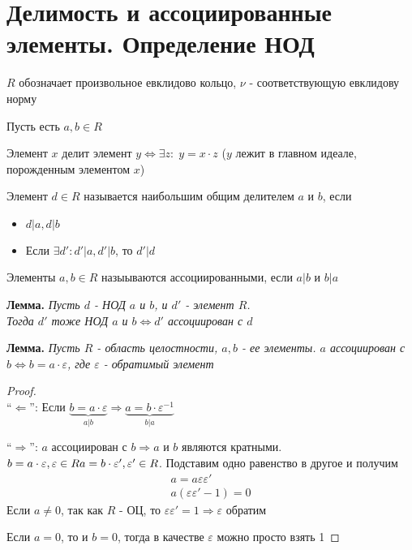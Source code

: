 \section{Делимость и ассоциированные элементы. Определение НОД}
\begin{normalsize}
    $R$ обозначает произвольное евклидово кольцо, $\nu$ - соответствующую евклидову норму
    \begin{theorem-non}
        Пусть есть $a, b \in R$
        \begin{conj}
            Элемент $x$ делит элемент $y \Longleftrightarrow \exists z: \; y = x \cdot z$ ($y$ лежит в главном идеале, порожденным элементом $x$)
        \end{conj}
        \begin{conj}
            Элемент $d \in R$ называется наибольшим общим делителем $a$ и $b$, если \begin{itemize}
                \item $d | a, d | b$
                \item Если $\exists d' : d' | a, d' | b$, то $d' | d$
            \end{itemize}
        \end{conj}
    \end{theorem-non}
        \begin{conj}
            Элементы $a, b \in R$ назыываются ассоциированными, если $a|b$ и $b|a$
        \end{conj}
        \textbf{Лемма.}
        \textit{Пусть $d$ - НОД $a$ и $b$, и $d'$ - элемент $R$. \\
        Тогда $d'$ тоже НОД $a$ и $b \Longleftrightarrow d'$ ассоциирован с $d$}

        \textbf{Лемма.} 
        \textit{
            Пусть $R$ - область целостности, $a, b$ - ее элементы. $a$ ассоциирован с $b \Longleftrightarrow b = a \cdot \varepsilon$, 
            где $\varepsilon$ - обратимый элемент 
        } 
        \begin{proof} \quad \\
            ``$\Longleftarrow$'': Если $\underbrace{b = a \cdot \varepsilon}_{a | b} \Longrightarrow \underbrace{a = b \cdot \varepsilon^{-1}}_{b | a}$ 

            ``$\Longrightarrow$'': $a$ ассоциирован с $b \Longrightarrow a$ и $b$ являются кратными. $b = a \cdot \varepsilon, \varepsilon \in R \\
            a = b \cdot \varepsilon', \varepsilon' \in R$. Подставим одно равенство в другое и получим 
            \begin{gather*}
                a = a\varepsilon\varepsilon' \\
                a(\varepsilon\varepsilon' - 1) = 0
            \end{gather*}
            Если $a \neq 0$, так как $R$ - ОЦ, то $\varepsilon\varepsilon' = 1 \Longrightarrow \varepsilon$ обратим 
            
            Если $a = 0$, то и $b = 0$, тогда в качестве $\varepsilon$ можно просто взять 1
        \end{proof}
\end{normalsize}
